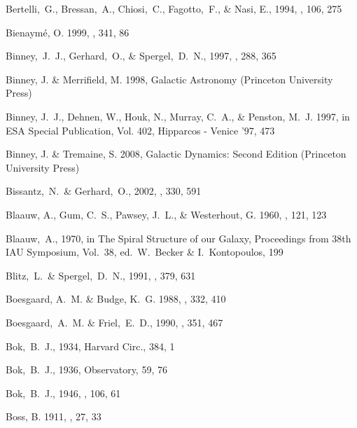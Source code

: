 \begin{thebibliography}{99}
  Bertelli,~G., Bressan,~A., Chiosi,~C., Fagotto,~F., \& Nasi, E., 1994,
  \aaps, 106, 275

{Bienaym{\'e}}, O. 1999, \aap, 341, 86

  Binney,~J.~J., Gerhard,~O., \& Spergel,~D.~N., 1997,
  \mnras, 288, 365

{Binney}, J. \& {Merrifield}, M. 1998, {Galactic Astronomy} (Princeton
  University Press)

{Binney}, J.~J., {Dehnen}, W., {Houk}, N., {Murray}, C.~A., \& {Penston}, M.~J.
  1997, in ESA Special Publication, Vol. 402, Hipparcos - Venice '97, 473

{Binney}, J. \& {Tremaine}, S. 2008, {Galactic Dynamics: Second Edition}
  (Princeton University Press)

  Bissantz,~N.~\& Gerhard,~O., 2002,
  \mnras, 330, 591

{Blaauw}, A., {Gum}, C.~S., {Pawsey}, J.~L., \& {Westerhout}, G. 1960, \mnras,
  121, 123

  Blaauw,~A., 1970, in The Spiral Structure of our Galaxy, Proceedings from 38th IAU Symposium, Vol.~38, ed.~W.~Becker \& I.~Kontopoulos, 199

  Blitz,~L.~\& Spergel,~D.~N., 1991, \apj, 379, 631

{Boesgaard}, A.~M. \& {Budge}, K.~G. 1988, \apj, 332, 410

  Boesgaard,~A.~M. \& Friel,~E.~D., 1990,
  \apj, 351, 467

  Bok,~B.~J., 1934,
  Harvard Circ., 384, 1

  Bok,~B.~J., 1936,
  Observatory, 59, 76

  Bok,~B.~J., 1946,
  \mnras, 106, 61

{Boss}, B. 1911, \aj, 27, 33


\end{thebibliography}

